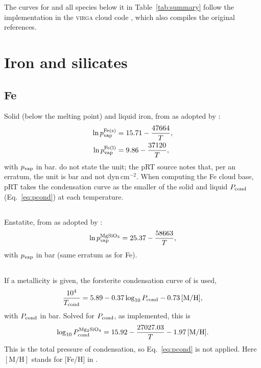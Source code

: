 \documentclass[11pt,a4paper]{article}
\newcommand{\pvap}{p_{\rm vap}}
\newcommand{\Pcond}{P_{\rm cond}}
\newcommand{\MH}{[\mathrm{M/H}]}
\newcommand{\chem}[1]{\mathrm{#1}}
\begin{document}
The curves for \chem{TiO_2} and all species below it in
Table~\ref{tab:summary} follow the implementation in the \textsc{virga}
cloud code \citep{batalha2025}, which also compiles the original
references.

\section{Iron and silicates}

\subsection{Fe}
Solid (below the melting point) and liquid iron, from
\citet{barshay1976} as adopted by \citet[][Eqs.~A3a,b]{ackerman2001}:
\begin{align}
  \ln \pvap^{\rm Fe(s)} &= 15.71 - \frac{47664}{T}, \\
  \ln \pvap^{\rm Fe(l)} &= 9.86 - \frac{37120}{T},
\end{align}
with $\pvap$ in bar. \citet{ackerman2001} do not state the unit; the pRT
source notes that, per an erratum, the unit is bar and not
dyn\,cm$^{-2}$. When computing the Fe cloud base, pRT takes the
condensation curve as the smaller of the solid and liquid
$\Pcond$ (Eq.~\ref{eq:pcond}) at each temperature.

\subsection{\texorpdfstring{\chem{MgSiO_3}}{MgSiO3}}
Enstatite, from \citet{barshay1976} as adopted by
\citet[][Eq.~A4]{ackerman2001}:
\begin{equation}
  \ln \pvap^{\rm MgSiO_3} = 25.37 - \frac{58663}{T},
\end{equation}
with $\pvap$ in bar (same erratum as for Fe).

\subsection{\texorpdfstring{\chem{Mg_2SiO_4}}{Mg2SiO4}}
\label{sec:mg2sio4}
If a metallicity is given, the forsterite condensation curve of
\citet{visscher2010} is used,
\begin{equation}
  \frac{10^4}{T_{\rm cond}} = 5.89 - 0.37\log_{10}\Pcond - 0.73\,\MH ,
\end{equation}
with $\Pcond$ in bar. Solved for $\Pcond$, as implemented, this is
\begin{equation}
  \log_{10} \Pcond^{\rm Mg_2SiO_4} = 15.92 - \frac{27027.03}{T} - 1.97\,\MH .
\end{equation}
This is the total pressure of condensation, so Eq.~\eqref{eq:pcond} is not
applied. Here $\MH$ stands for [Fe/H] in \citet{visscher2010}.
\end{document}
